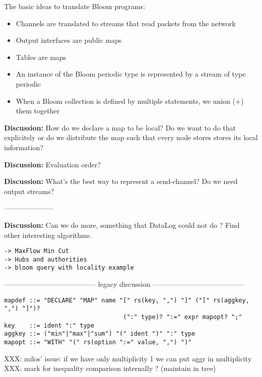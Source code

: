 \documentclass[11pt]{article}
\newlength{\dlen}
\def\discuss#1{\par\hspace{2em}
\setlength{\dlen}{\textwidth}
\addtolength{\dlen}{-2em}
\begin{minipage}{\dlen}\footnotesize {\bf\color{red} Discussion:} #1\end{minipage}\par}
\begin{document}
The basic ideas to translate Bloom programs:
\begin{itemize}
\item Channels are translated to streams that read packets from the network
\item Output interfaces are public maps
\item Tables are maps
\item An instance of the Bloom periodic type is represented by a stream of type periodic
\item When a Bloom collection is defined by multiple statements, we union ($+$) them together
\end{itemize} 

\discuss{How do we declare a map to be local? Do we want to do that explicitely or do we distribute the map such that every node stores stores its local information?}
\discuss{Evaluation order?}
\discuss{What's the best way to represent a send-channel? Do we need output streams?}

---------------------
\discuss{Can we do more, something that DataLog could not do ? Find other interesting algorithms.}

\begin{verbatim}
-> MaxFlow Min Cut
-> Hubs and authorities
-> bloom query with locality example
\end{verbatim}

{\center --------------------------------------- legacy discussion ---------------------------------------}
\begin{verbatim}
mapdef ::= "DECLARE" "MAP" name "[" rs(key, ",") "]" ("[" rs(aggkey, ",") "]")? 
                                 (":" type)? ":=" expr mapopt? ";" 
key    ::= ident ":" type
aggkey ::= ("min"|"max"|"sum") "(" ident ")" ":" type
mapopt ::= "WITH" "(" rs(option ":=" value, ",") ")"
\end{verbatim}

{\color{red}
XXX: milos' issue: if we have only multiplicity 1 we can put aggr in multiplicity\\
XXX: mark for inequality comparison internally ? (maintain in tree)
}
\end{document}
